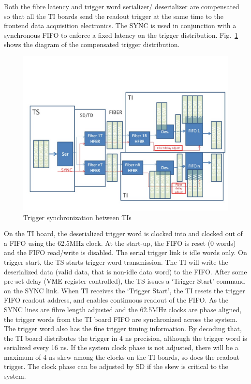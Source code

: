 Both the fibre latency and trigger word serializer/ deserializer are compensated so that all the TI boards send the readout trigger at the same time to the frontend data acquisition electronics.  The SYNC is used in conjunction with a synchronous FIFO to enforce a fixed latency on the trigger distribution. Fig.~\ref{fig:TIsync} shows the diagram of the compensated trigger distribution.

\begin{figure}[hbt]
	\centering
	\includegraphics[width=1.0\columnwidth,keepaspectratio]{img/TrgSync.jpg}
	\caption{Trigger synchronization between TIs}
	\label{fig:TIsync}
\end{figure}

On the TI board, the deserialized trigger word is clocked into and clocked out of a FIFO using the 62.5MHz clock.  At the start-up, the FIFO is reset (0 words) and the FIFO read/write is disabled.  The serial trigger link is idle words only.  On trigger start, the TS starts trigger word transmission.  The TI will write the deserialized data (valid data, that is non-idle data word) to the FIFO.  After some pre-set delay (VME register controlled), the TS issues a ‘Trigger Start’ command on the SYNC link.  When TI receives the ‘Trigger Start’, the TI resets the trigger FIFO readout address, and enables continuous readout of the FIFO.  As the SYNC lines are fibre length adjusted and the 62.5MHz clocks are phase aligned, the trigger words from the TI board FIFO are synchronized across the system.
The trigger word also has the fine trigger timing information.  By decoding that, the TI board distributes the trigger in 4 ns precision, although the trigger word is serialized every 16 ns.  If the system clock phase is not adjusted, there will be a maximum of 4 ns skew among the clocks on the TI boards, so does the readout trigger.  The clock phase can be adjusted by SD if the skew is critical to the system.

